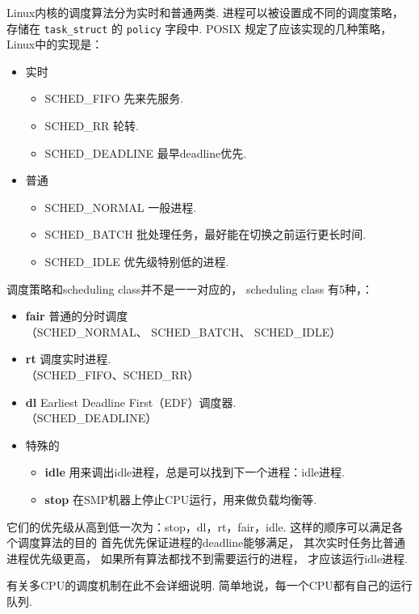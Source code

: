 Linux内核的调度算法分为实时和普通两类.
进程可以被设置成不同的调度策略，
存储在 \lstinline{task_struct} 的 \lstinline{policy} 字段中.
POSIX 规定了应该实现的几种策略\cite{schedh}，
Linux中的实现是：
\begin{itemize}
	\item 实时
	      \begin{itemize}
		      \item SCHED\_FIFO 先来先服务.
		      \item SCHED\_RR 轮转.
		      \item SCHED\_DEADLINE 最早deadline优先.
	      \end{itemize}
	\item 普通
	      \begin{itemize}
		      \item SCHED\_NORMAL 一般进程.
		      \item SCHED\_BATCH 批处理任务，最好能在切换之前运行更长时间.
		      \item SCHED\_IDLE 优先级特别低的进程.
	      \end{itemize}
\end{itemize}

调度策略和scheduling class并不是一一对应的，
scheduling class 有5种，：
\begin{itemize}
	\item \textbf{fair} 普通的分时调度 \\
	      （SCHED\_NORMAL、 SCHED\_BATCH、 SCHED\_IDLE）
	\item \textbf{rt} 调度实时进程. \\
	      （SCHED\_FIFO、SCHED\_RR）
	\item \textbf{dl} Earliest Deadline First（EDF）调度器. \\
	      （SCHED\_DEADLINE）
	\item 特殊的
	      \begin{itemize}
		      \item \textbf{idle} 用来调出idle进程，总是可以找到下一个进程：idle进程.
		      \item \textbf{stop} 在SMP机器上停止CPU运行，用来做负载均衡等.
	      \end{itemize}
\end{itemize}

它们的优先级从高到低一次为：stop，dl，rt，fair，idle.
这样的顺序可以满足各个调度算法的目的
首先优先保证进程的deadline能够满足，
其次实时任务比普通进程优先级更高，
如果所有算法都找不到需要运行的进程，
才应该运行idle进程.

\begin{notebox}
	有关多CPU的调度机制在此不会详细说明.
	简单地说，每一个CPU都有自己的运行队列.
\end{notebox}

